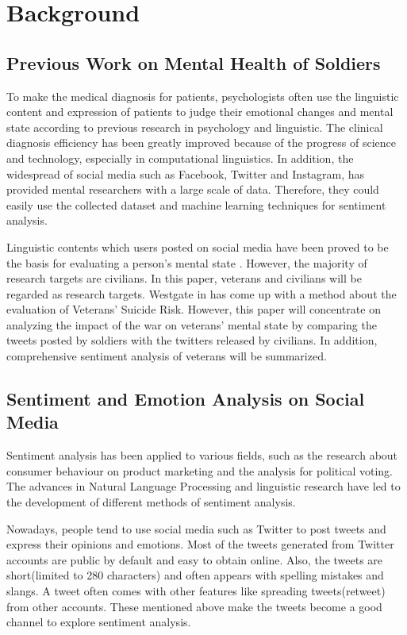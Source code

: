 \section{Background}

\subsection{Previous Work on Mental Health of Soldiers}

To make the medical diagnosis for patients, psychologists often use the linguistic content and expression of patients to judge their emotional changes and mental state according to previous research in psychology and linguistic. The clinical diagnosis efficiency has been greatly improved because of the progress of science and technology, especially in computational linguistics. In addition, the widespread of social media such as Facebook, Twitter and Instagram, has provided mental researchers with a large scale of data. Therefore, they could easily use the collected dataset and machine learning techniques for sentiment analysis.

Linguistic contents which users posted on social media have been proved to be the basis for evaluating a person's mental state \citep{becauseIwastoldsomuch} \citep{GUNTUKU201743}. However, the majority of research targets are civilians. In this paper, veterans and civilians will be regarded as research targets. Westgate in \citep{doi:10.1176/appi.ps.201400283} has come up with a method about the evaluation of Veterans’ Suicide Risk. However, this paper will concentrate on analyzing the impact of the war on veterans' mental state by comparing the tweets posted by soldiers with the twitters released by civilians. In addition, comprehensive sentiment analysis of veterans will be summarized.

\subsection{Sentiment and Emotion Analysis on Social Media}

Sentiment analysis has been applied to various fields, such as the research about consumer behaviour on product marketing and the analysis for political voting. The advances in Natural Language Processing and linguistic research have led to the development of different methods of sentiment analysis.

Nowadays, people tend to use social media such as Twitter to post tweets and express their opinions and emotions. Most of the tweets generated from Twitter accounts are public by default and easy to obtain online. Also, the tweets are short(limited to 280 characters) and often appears with spelling mistakes and slangs. A tweet often comes with other features like spreading tweets(retweet) from other accounts. These mentioned above make the tweets become a good channel to explore sentiment analysis.


